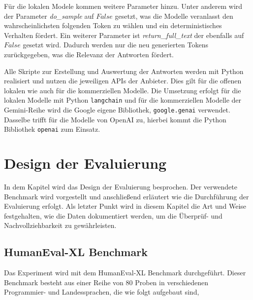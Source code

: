 Für die lokalen Modele kommen weitere Parameter hinzu. Unter anderem wird der Parameter \textit{do\_sample} auf $False$ gesetzt, was die Modelle veranlasst den wahrscheinlichsten folgenden Token zu wählen und ein deterministisches Verhalten fördert. Ein weiterer Parameter ist \textit{return\_full\_text} der ebenfalls auf $False$ gesetzt wird. Dadurch werden nur die neu generierten Tokens zurückgegeben, was die Relevanz der Antworten fördert.\vspace{0.2cm}

Alle Skripte zur Erstellung und Auswertung der Antworten werden mit Python realisiert und nutzen die jeweiligen APIs der Anbieter. Dies gilt für die offenen lokalen wie auch für die kommerziellen Modelle. Die Umsetzung erfolgt für die lokalen Modelle mit Python \texttt{langchain} und für die kommerziellen Modelle der Gemini-Reihe wird die Google eigene Bibliothek, \texttt{google.genai} verwendet. Dasselbe trifft für die Modelle von OpenAI zu, hierbei kommt die Python Bibliothek \texttt{openai} zum Einsatz.



\section{Design der Evaluierung}
In dem Kapitel wird das Design der Evaluierung besprochen. Der verwendete Benchmark wird vorgestellt und anschließend erläutert wie die Durchführung der Evaluierung erfolgt. Als letzter Punkt wird in diesem Kapitel die Art und Weise festgehalten, wie die Daten dokumentiert werden, um die Überprüf- und Nachvollziehbarkeit zu gewährleisten.


\subsection{HumanEval-XL Benchmark}\label{subsec:structor_of_humaneval_xl}
Das Experiment wird mit dem HumanEval-XL Benchmark durchgeführt. Dieser Benchmark besteht aus einer Reihe von 80 Proben in verschiedenen Programmier- und Landessprachen, die wie folgt aufgebaut sind,

